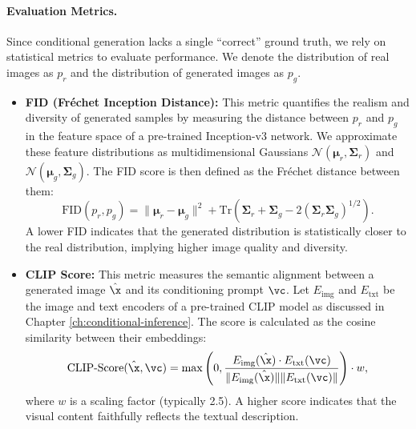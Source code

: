 \documentclass[../../book-main.tex]{subfiles}
\begin{document}
\paragraph{Evaluation Metrics.}
Since conditional generation lacks a single ``correct'' ground truth,
we rely on statistical metrics to evaluate performance. We denote the
distribution of real images as $p_r$ and the distribution of
generated images as $p_g$.

\begin{itemize}
\item \textbf{FID (Fréchet Inception Distance):} This metric
    quantifies the realism and diversity of generated samples by
    measuring the distance between $p_r$ and $p_g$ in the feature
    space of a pre-trained Inception-v3 network. We approximate these
    feature distributions as multidimensional Gaussians
    $\mathcal{N}(\bm{\mu}_r, \bm{\Sigma}_r)$ and
    $\mathcal{N}(\bm{\mu}_g, \bm{\Sigma}_g)$. The FID score is then
    defined as the Fréchet distance between them:
    \begin{equation}
        \text{FID}(p_r, p_g) = \| \bm{\mu}_r - \bm{\mu}_g \|^2 +
        \text{Tr}\left( \bm{\Sigma}_r + \bm{\Sigma}_g -
        2(\bm{\Sigma}_r \bm{\Sigma}_g)^{1/2} \right).
    \end{equation}
    A lower FID indicates that the generated distribution is
    statistically closer to the real distribution, implying higher
    image quality and diversity.

\item \textbf{CLIP Score:} This metric measures the semantic
    alignment between a generated image $\hat{\x}$ and its
    conditioning prompt $\vc$. Let $E_{\text{img}}$ and
    $E_{\text{txt}}$ be the image and text encoders of a pre-trained
    CLIP model as discussed in Chapter
    \ref{ch:conditional-inference}. The score is calculated as the
    cosine similarity between their embeddings:
    \begin{equation}
        \text{CLIP-Score}(\hat{\x}, \vc) = \max \left( 0,
            \frac{E_{\text{img}}(\hat{\x}) \cdot
            E_{\text{txt}}(\vc)}{\|E_{\text{img}}(\hat{\x})\|
        \|E_{\text{txt}}(\vc)\|} \right) \cdot w,
    \end{equation}
    where $w$ is a scaling factor (typically 2.5). A higher score
    indicates that the visual content faithfully reflects the textual
    description.
\end{itemize}
\end{document}
